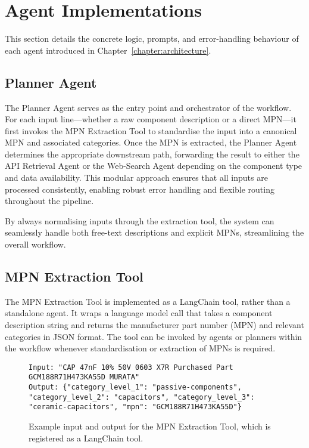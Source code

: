 \section{Agent Implementations}
This section details the concrete logic, prompts, and error-handling behaviour of each agent introduced in Chapter~\ref{chapter:architecture}.

\subsection{Planner Agent}

The Planner Agent serves as the entry point and orchestrator of the workflow. For each input line—whether a raw component description or a direct MPN—it first invokes the MPN Extraction Tool to standardise the input into a canonical MPN and associated categories. Once the MPN is extracted, the Planner Agent determines the appropriate downstream path, forwarding the result to either the API Retrieval Agent or the Web-Search Agent depending on the component type and data availability. This modular approach ensures that all inputs are processed consistently, enabling robust error handling and flexible routing throughout the pipeline.

By always normalising inputs through the extraction tool, the system can seamlessly handle both free-text descriptions and explicit MPNs, streamlining the overall workflow.

\subsection{MPN Extraction Tool}

The MPN Extraction Tool is implemented as a LangChain tool, rather than a standalone agent. It wraps a language model call that takes a component description string and returns the manufacturer part number (MPN) and relevant categories in JSON format. The tool can be invoked by agents or planners within the workflow whenever standardisation or extraction of MPNs is required.

\begin{figure}[H]
\centering
\begin{minipage}{0.9\textwidth}
\begin{verbatim}
Input: "CAP 47nF 10% 50V 0603 X7R Purchased Part GCM188R71H473KA55D MURATA"
Output: {"category_level_1": "passive-components", "category_level_2": "capacitors", "category_level_3": "ceramic-capacitors", "mpn": "GCM188R71H473KA55D"}
\end{verbatim}
\end{minipage}
\caption{Example input and output for the MPN Extraction Tool, which is registered as a LangChain tool.}
\label{lst:mpn_schema}
\end{figure}

